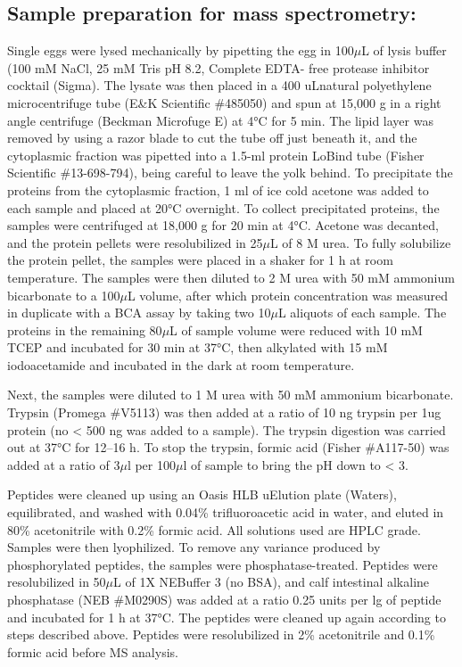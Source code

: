 \documentclass[11pt,twocolumn]{article}
\begin{document}
\hypertarget{sample-preparation-for-mass-spectrometry}{%
\subsection{Sample preparation for mass
spectrometry:}\label{sample-preparation-for-mass-spectrometry}}

Single eggs were lysed mechanically by pipetting the egg in 100\(\mu\)L
of lysis buffer (100 mM NaCl, 25 mM Tris pH 8.2, Complete EDTA- free
protease inhibitor cocktail (Sigma). The lysate was then placed in a 400
uLnatural polyethylene microcentrifuge tube (E\&K Scientific \#485050)
and spun at 15,000 g in a right angle centrifuge (Beckman Microfuge E)
at 4°C for 5 min. The lipid layer was removed by using a razor blade to
cut the tube off just beneath it, and the cytoplasmic fraction was
pipetted into a 1.5-ml protein LoBind tube (Fisher Scientific
\#13-698-794), being careful to leave the yolk behind. To precipitate
the proteins from the cytoplasmic fraction, 1 ml of ice cold acetone was
added to each sample and placed at 20°C overnight. To collect
precipitated proteins, the samples were centrifuged at 18,000 g for 20
min at 4°C. Acetone was decanted, and the protein pellets were
resolubilized in 25\(\mu\)L of 8 M urea. To fully solubilize the protein
pellet, the samples were placed in a shaker for 1 h at room temperature.
The samples were then diluted to 2 M urea with 50 mM ammonium
bicarbonate to a 100\(\mu\)L volume, after which protein concentration
was measured in duplicate with a BCA assay by taking two 10\(\mu\)L
aliquots of each sample. The proteins in the remaining 80\(\mu\)L of
sample volume were reduced with 10 mM TCEP and incubated for 30 min at
37°C, then alkylated with 15 mM iodoacetamide and incubated in the dark
at room temperature.

Next, the samples were diluted to 1 M urea with 50 mM ammonium
bicarbonate. Trypsin (Promega \#V5113) was then added at a ratio of 10
ng trypsin per 1ug protein (no \textless{} 500 ng was added to a
sample). The trypsin digestion was carried out at 37°C for 12--16 h. To
stop the trypsin, formic acid (Fisher \#A117-50) was added at a ratio of
3\(\mu\)l per 100\(\mu\)l of sample to bring the pH down to \textless{}
3.

Peptides were cleaned up using an Oasis HLB uElution plate (Waters),
equilibrated, and washed with 0.04\% trifluoroacetic acid in water, and
eluted in 80\% acetonitrile with 0.2\% formic acid. All solutions used
are HPLC grade. Samples were then lyophilized. To remove any variance
produced by phosphorylated peptides, the samples were
phosphatase-treated. Peptides were resolubilized in 50\(\mu\)L of 1X
NEBuffer 3 (no BSA), and calf intestinal alkaline phosphatase (NEB
\#M0290S) was added at a ratio 0.25 units per lg of peptide and
incubated for 1 h at 37°C. The peptides were cleaned up again according
to steps described above. Peptides were resolubilized in 2\%
acetonitrile and 0.1\% formic acid before MS analysis.
\end{document}
